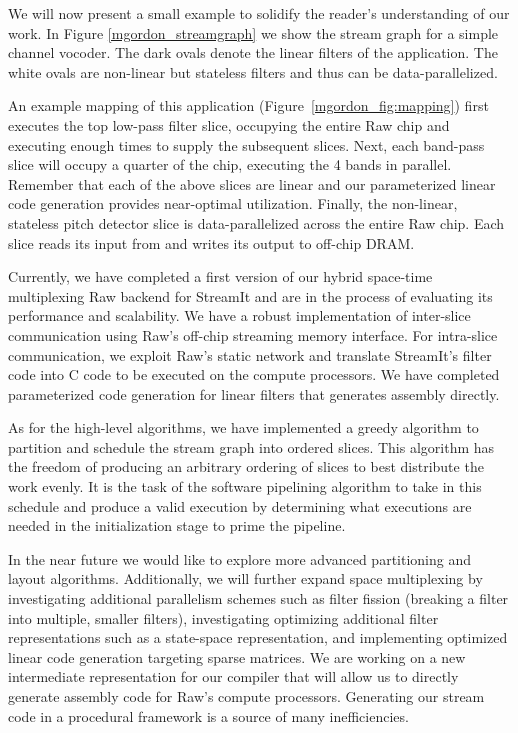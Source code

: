 \documentclass{csailabstractbook}
\begin{document}
We will now present a small example to solidify the reader's
understanding of our work.  In Figure \ref{mgordon_streamgraph} we show the
stream graph for a simple channel vocoder.  The dark ovals denote the
linear filters of the application.  The white ovals are non-linear but
stateless filters and thus can be data-parallelized.

An example mapping of this application (Figure~\ref{mgordon_fig:mapping})
first executes the top low-pass filter slice, occupying the entire Raw
chip and executing enough times to supply the subsequent slices. Next,
each band-pass slice will occupy a quarter of the chip, executing the
4 bands in parallel.  Remember that each of the above slices are
linear and our parameterized linear code generation provides
near-optimal utilization. Finally, the non-linear, stateless pitch
detector slice is data-parallelized across the entire Raw chip. Each
slice reads its input from and writes its output to off-chip DRAM.
 
Currently, we have completed a first version of our hybrid space-time
multiplexing Raw backend for StreamIt and are in the process of
evaluating its performance and scalability.  We have a robust
implementation of inter-slice communication using Raw's off-chip
streaming memory interface.  For intra-slice communication, we exploit
Raw's static network and translate StreamIt's filter code into C
code to be executed on the compute processors.  We have completed
parameterized code generation for linear filters that generates
assembly directly.   

As for the high-level algorithms, we have implemented a greedy
algorithm to partition and schedule the stream graph into ordered slices.
This algorithm has the freedom of producing an arbitrary ordering of slices
to best distribute the work evenly. It is the task of the software
pipelining algorithm to take in this schedule and produce a valid
execution by determining what executions are needed in the initialization
stage to prime the pipeline.

In the near future we would like to explore more advanced partitioning
and layout algorithms.  Additionally, we will further expand space
multiplexing by investigating additional parallelism schemes such as
filter fission (breaking a filter into multiple, smaller filters),
investigating optimizing additional filter representations such as a
state-space representation, and implementing optimized linear code
generation targeting sparse matrices.  We are working on a new
intermediate representation for our compiler that will allow us to
directly generate assembly code for Raw's compute
processors. Generating our stream code in a procedural framework is a
source of many inefficiencies.
 
\end{document}
